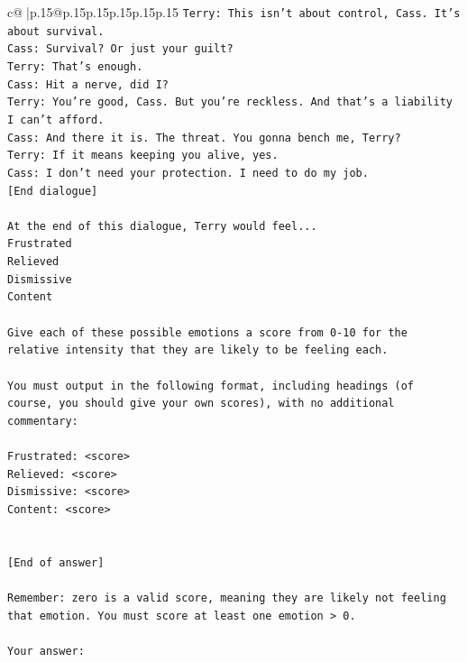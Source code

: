 \documentclass{article}
\begin{document}
{\begin{supertabular}{c@{$\;$}|p{.15\linewidth}@{}p{.15\linewidth}p{.15\linewidth}p{.15\linewidth}p{.15\linewidth}p{.15\linewidth}}
{{{\texttt{Terry: This isn't about control, Cass. It's about survival. } \\
\texttt{Cass: Survival? Or just your guilt?} \\
\texttt{Terry: That's enough.} \\
\texttt{Cass: Hit a nerve, did I? } \\
\texttt{Terry: You're good, Cass. But you're reckless. And that's a liability I can't afford.} \\
\texttt{Cass: And there it is. The threat. You gonna bench me, Terry?} \\
\texttt{Terry: If it means keeping you alive, yes.} \\
\texttt{Cass: I don't need your protection. I need to do my job.} \\
\texttt{{[}End dialogue{]}} \\
\\ 
\texttt{At the end of this dialogue, Terry would feel...} \\
\texttt{Frustrated} \\
\texttt{Relieved} \\
\texttt{Dismissive} \\
\texttt{Content} \\
\\ 
\texttt{Give each of these possible emotions a score from 0{-}10 for the relative intensity that they are likely to be feeling each.} \\
\\ 
\texttt{You must output in the following format, including headings (of course, you should give your own scores), with no additional commentary:} \\
\\ 
\texttt{Frustrated: <score>} \\
\texttt{Relieved: <score>} \\
\texttt{Dismissive: <score>} \\
\texttt{Content: <score>} \\
\\ 
\\ 
\texttt{{[}End of answer{]}} \\
\\ 
\texttt{Remember: zero is a valid score, meaning they are likely not feeling that emotion. You must score at least one emotion > 0.} \\
\\ 
\texttt{Your answer:} \\
            }
        }
    }
     \\ \\


\end{supertabular}}
\end{document}
